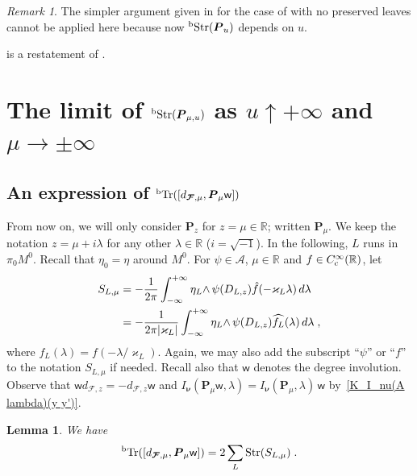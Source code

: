 \documentclass{memo-l}
\theoremstyle{plain}
\newtheorem{lem}[thm]{Lemma}
\theoremstyle{definition}
\theoremstyle{remark}
\newtheorem{rem}[thm]{Remark}
\newcommand{\R}{\mathbb{R}}
\renewcommand{\AA}{\mathcal{A}}
\newcommand{\FF}{\mathcal{F}}
\newcommand{\bfP}{\boldsymbol{P}}
\newcommand{\bfFF}{\boldsymbol{\FF}}
\newcommand{\bfnu}{\boldsymbol{\nu}}
\newcommand{\sw}{\mathsf{w}}
\newcommand{\Tr}{\operatorname{Tr}}
\newcommand{\bTr}{{}^{\text{\rm b}}\!\Tr}
\newcommand{\Str}{\operatorname{Str}}
\newcommand{\bStr}{{}^{\text{\rm b}}\!\Str}
\newcommand{\Cinftyc}{C^\infty_{\text{\rm c}}}
\numberwithin{section}{chapter}
\numberwithin{equation}{section}%
\begin{document}
\begin{rem}\label{r: lim_u -> 0 bTrs(P_u z) if there are no preserved leaves} 
The simpler argument given in \cite{AlvKordy2002,AlvKordy2008a} for the case of  with no preserved leaves cannot be applied here because now $\bStr(\bfP_u)$ depends on $u$.
\end{rem}

 is a restatement of .




\section{The limit of $\bStr(\bfP_{\mu,u})$ as $u\uparrow+\infty$ and $\mu\to\pm\infty$}
\label{s: lim_mu to infty lim_u to infty bTrs(P_u mu)}


\subsection{An expression of $\bTr([d_{\bfFF,\mu},\bfP_\mu\sw])$}\label{ss: bTrs([d_bfFF mu P_mu sw])}

From now on, we will only consider $\bfP_z$ for $z=\mu\in\R$; written $\bfP_\mu$. We keep the notation $z=\mu+i\lambda$ for any other $\lambda\in\R$ ($i=\sqrt{-1}$). In the following, $L$ runs in $\pi_0M^0$. Recall that $\eta_0=\eta$ around $M^0$. For $\psi\in\AA$, $\mu\in\R$ and $f\in\Cinftyc(\R)$, let
\begin{align}
S_{L,\mu}&=-\frac1{2\pi}\int_{-\infty}^{+\infty} {\eta_L\wedge}\,\psi(D_{L,z})\hat f(-\varkappa_L\lambda)\,d\lambda\notag\\
&=-\frac1{2\pi|\varkappa_L|}\int_{-\infty}^{+\infty} {\eta_L\wedge}\,\psi(D_{L,z})\widehat{f_L}(\lambda)\,d\lambda\;,\label{S_L mu}
\end{align}
where $f_L(\lambda)=f(-\lambda/\varkappa_L)$. Again, we may also add the subscript ``$\psi$'' or ``$f$'' to the notation $S_{L,\mu}$ if needed. Recall also that $\sw$ denotes the degree involution. Observe that $\sw d_{\bfFF,z}=-d_{\bfFF,z}\sw$ and $I_{\bfnu}(\bfP_\mu\sw,\lambda)=I_{\bfnu}(\bfP_\mu,\lambda)\,\sw$ by~\eqref{K_I_nu(A lambda)(y y')}.

\begin{lem}\label{l: bTr([d_FF mu P_mu bfw]) = 2 sum_L Trs(S_L mu)}
We have
\[
\bTr([d_{\bfFF,\mu},\bfP_\mu\sw])=2\sum_L\Str(S_{L,\mu})\;.
\]
\end{lem}
\end{document}
